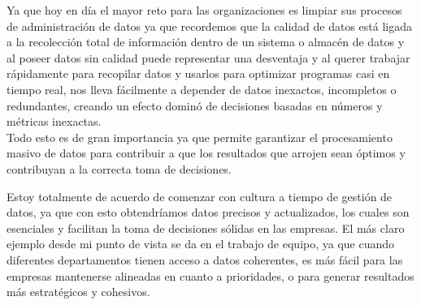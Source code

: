 \documentclass{article}
\begin{document}
Ya que hoy en día el mayor reto para las organizaciones es limpiar sus procesos de administración de datos  ya que recordemos que la calidad de datos está ligada a la recolección total de información dentro de un sistema o almacén de datos y al poseer datos sin calidad puede representar una desventaja y al querer trabajar rápidamente para recopilar datos y usarlos para optimizar programas casi en tiempo real,  nos lleva fácilmente a depender de datos inexactos, incompletos o redundantes, creando un efecto dominó de decisiones basadas en números y métricas inexactas. \\

Todo esto es de gran importancia ya que permite garantizar el procesamiento masivo de datos para contribuir a que los resultados que arrojen sean óptimos y contribuyan a la correcta toma de decisiones. 

Estoy totalmente de acuerdo de comenzar con cultura a tiempo de gestión de datos, ya que con esto  obtendríamos datos precisos y actualizados, los cuales son esenciales y facilitan la toma de decisiones sólidas en las empresas. El más claro ejemplo desde mi punto de vista se da en el trabajo de equipo, ya que cuando diferentes departamentos tienen acceso a datos coherentes, es más fácil para las empresas mantenerse alineadas en cuanto a prioridades, o para generar resultados más estratégicos y cohesivos.  
\end{document}
